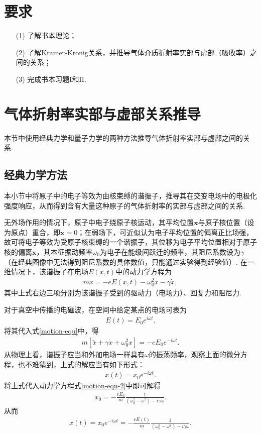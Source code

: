\documentclass{assignment}
\begin{document}
\section*{要求}
\begin{itemize}
    \item[(1)] 了解书本理论；
    \item[(2)] 了解Kramer-Kronig关系，并推导气体介质折射率实部与虚部（吸收率）之间的关系；
    \item[(3)] 完成书本习题I和II.
\end{itemize}

\section{气体折射率实部与虚部关系推导}
本节中使用经典力学和量子力学的两种方法推导气体折射率实部与虚部之间的关系.

\subsection{经典力学方法}
本小节中将原子中的电子等效为由核束缚的谐振子，推导其在交变电场中的电极化强度响应，从而得到含有大量这种原子的气体折射率的实部与虚部之间的关系.

无外场作用的情况下，原子中电子绕原子核运动，其平均位置$\bm{x}$与原子核位置（设为原点）重合，即$\bm{x}=0$；在弱场下，可近似认为电子平均位置的偏离正比场强，故可将电子等效为受原子核束缚的一个谐振子，其位移为电子平均位置相对于原子核的偏离$\bm{x}$，其本征振动频率$\omega_0$为电子在能级间跃迁的频率，其阻尼系数设为$\gamma$（在经典图像中无法得到阻尼系数的具体数值，只能通过实验得到经验值）. 在一维情况下，该谐振子在电场$E(x,t)$中的动力学方程为
\begin{align}
    \label{motion-equ}
    m\ddot{x}=-eE(x,t)-\omega_0^2x-\gamma\dot{x},
\end{align}
其中上式右边三项分别为该谐振子受到的驱动力（电场力）、回复力和阻尼力.

对于真空中传播的电磁波，在空间中给定某点的电场可表为
\begin{align}
    E(t)=E_0e^{i\omega t}.
\end{align}
将其代入式\eqref{motion-equ}中，得
\begin{align}
    \label{motion-equ-2}
    m[\ddot{x}+\gamma\dot{x}+\omega_0^2x]=-eE_0e^{-i\omega t}.
\end{align}
从物理上看，谐振子应当和外加电场一样具有$\omega$的振荡频率，观察上面的微分方程，也不难猜到，上式的解应当有如下形式：
\begin{align}
    \label{trial-sol}
    x(t)=x_0e^{-i\omega t}.
\end{align}
将上式代入动力学方程式\eqref{motion-equ-2}中即可解得
\begin{align}
    x_0=-\frac{eE_0}{m}\frac{1}{(\omega_0^2-\omega^2)-i\gamma\omega}.
\end{align}
从而
\begin{align}
    x(t)=x_0e^{-i\omega t}=-\frac{eE(t)}{m}\frac{1}{(\omega_0^2-\omega^2)-i\gamma\omega}.
\end{align}
\end{document}
